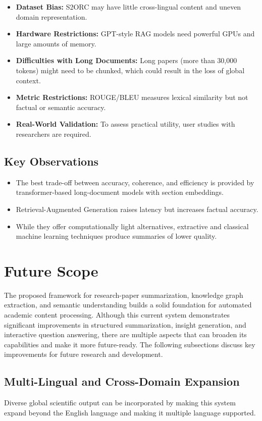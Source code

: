 \documentclass[conference]{IEEEtran}
\begin{document}
\begin{itemize}
\item \textbf{Dataset Bias:}
S2ORC may have little cross-lingual content and uneven domain representation.
\item \textbf{Hardware Restrictions:} GPT-style RAG models need powerful GPUs and large amounts of memory.
\item \textbf{Difficulties with Long Documents:} Long papers (more than 30,000 tokens) might need to be chunked, which could result in the loss of global context.
\item \textbf{Metric Restrictions:} ROUGE/BLEU measures lexical similarity but not factual or semantic accuracy.
\item \textbf{Real-World Validation:} To assess practical utility, user studies with researchers are required.
\end{itemize}

\subsection{Key Observations}

\begin{itemize}
\item The best trade-off between accuracy, coherence, and efficiency is provided by transformer-based long-document models with section embeddings.
\item Retrieval-Augmented Generation raises latency but increases factual accuracy.
\item While they offer computationally light alternatives, extractive and classical machine learning techniques produce summaries of lower quality.
\end{itemize}


\section{Future Scope}
The proposed framework for research-paper summarization, knowledge graph extraction, and semantic understanding builds a solid foundation for automated academic content processing. Although this current system demonstrates significant improvements in structured summarization, insight generation, and interactive question answering, there are multiple aspects that can broaden its capabilities and make it more future-ready. The following subsections discuss key improvements for future research and development.

\subsection{Multi-Lingual and Cross-Domain Expansion}
Diverse global scientific output can be incorporated by making this system expand beyond the English language and making it multiple language supported.
\end{document}
